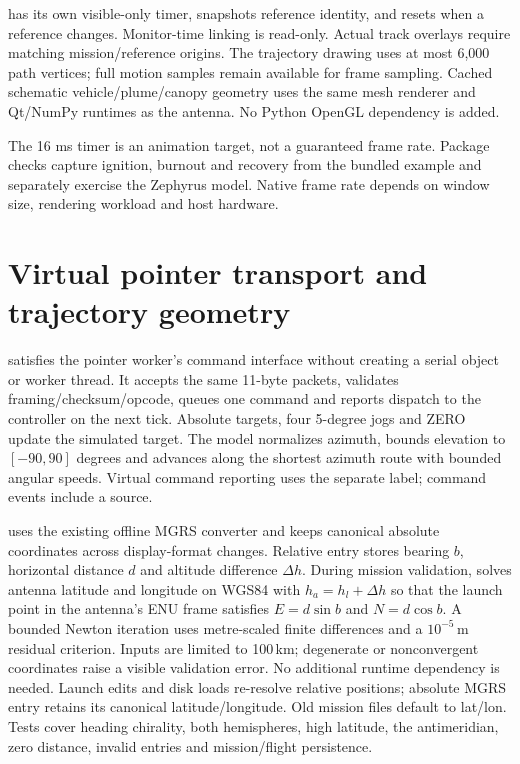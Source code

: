  has its own visible-only timer, snapshots reference identity,
and resets when a reference changes. Monitor-time linking is read-only. Actual
track overlays require matching mission/reference origins. The trajectory drawing
uses at most 6,000 path vertices; full motion samples remain available for frame
sampling. Cached schematic vehicle/plume/canopy geometry uses the same mesh
renderer and Qt/NumPy runtimes as the antenna. No Python OpenGL dependency is added.

The 16 ms timer is an animation target, not a guaranteed frame rate. Package
checks capture ignition, burnout and recovery from the bundled example and
separately exercise the Zephyrus model. Native frame rate depends on window
size, rendering workload and host hardware.

\section{Virtual pointer transport and trajectory geometry}
 satisfies the pointer worker's command interface without
creating a serial object or worker thread. It accepts the same 11-byte packets,
validates framing/checksum/opcode, queues one command and reports dispatch to the
controller on the next tick. Absolute targets, four 5-degree jogs and ZERO update
the simulated target. The model normalizes azimuth, bounds elevation to
$[-90,90]$ degrees and advances along the shortest azimuth route with bounded
angular speeds. Virtual command reporting uses the separate  label; command events include a  source.

 uses the existing offline MGRS converter and keeps
canonical absolute coordinates across display-format changes. Relative entry
stores bearing $b$, horizontal distance $d$ and altitude difference $\Delta h$.
During mission validation,  solves antenna latitude
and longitude on WGS84 with $h_a=h_l+\Delta h$ so that the launch point in the
antenna's ENU frame satisfies $E=d\sin b$ and $N=d\cos b$. A bounded Newton
iteration uses metre-scaled finite differences and a $10^{-5}$\,m residual
criterion. Inputs are limited to 100\,km; degenerate or nonconvergent coordinates
raise a visible validation error. No additional runtime dependency is needed.
Launch edits and disk loads re-resolve relative positions; absolute MGRS entry
retains its canonical latitude/longitude. Old mission files default to lat/lon.
Tests cover heading chirality, both hemispheres, high latitude, the antimeridian,
zero distance, invalid entries and mission/flight persistence.


